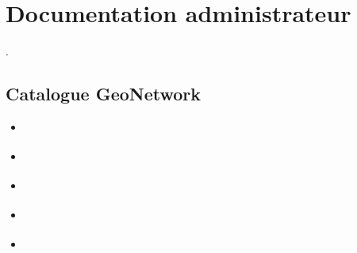 \documentclass[letterpaper,10pt,french]{sphinxmanual}
\begin{document}
\sphinxstepscope


\chapter{Documentation administrateur}
\label{\detokenize{doc_admin:documentation-administrateur}}\label{\detokenize{doc_admin::doc}}
\sphinxAtStartPar
{}.

\sphinxstepscope


\section{Catalogue \sphinxhyphen{} GeoNetwork}
\label{\detokenize{doc_admin/catalogue:catalogue-geonetwork}}\label{\detokenize{doc_admin/catalogue::doc}}
\begin{sphinxShadowBox}
\begin{itemize}
\item {} 
\sphinxAtStartPar
{}\label{\detokenize{doc_admin/catalogue:id2}}{\hyperref[\detokenize{doc_admin/catalogue:introduction}]{}}

\item {} 
\sphinxAtStartPar
{}\label{\detokenize{doc_admin/catalogue:id3}}{\hyperref[\detokenize{doc_admin/catalogue:gestion-des-fiches-de-metadonnees}]{}}

\item {} 
\sphinxAtStartPar
{}\label{\detokenize{doc_admin/catalogue:id4}}{\hyperref[\detokenize{doc_admin/catalogue:gerer-les-droits-d-acces-aux-fiches-de-metadonnees}]{}}

\item {} 
\sphinxAtStartPar
{}\label{\detokenize{doc_admin/catalogue:id5}}{\hyperref[\detokenize{doc_admin/catalogue:creer-une-fiche-a-la-main}]{}}

\item {} 
\sphinxAtStartPar
{}\label{\detokenize{doc_admin/catalogue:id6}}{\hyperref[\detokenize{doc_admin/catalogue:administration}]{}}

\end{itemize}
\end{sphinxShadowBox}
\end{document}
